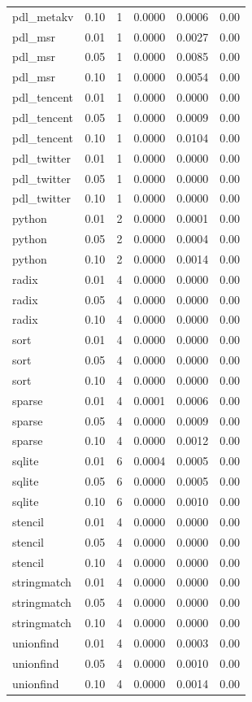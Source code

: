 \begin{tabular}{lcrrrr}
pdl\_metakv & 0.10 & 1 & 0.0000 & 0.0006 & 0.00 \\
pdl\_msr & 0.01 & 1 & 0.0000 & 0.0027 & 0.00 \\
pdl\_msr & 0.05 & 1 & 0.0000 & 0.0085 & 0.00 \\
pdl\_msr & 0.10 & 1 & 0.0000 & 0.0054 & 0.00 \\
pdl\_tencent & 0.01 & 1 & 0.0000 & 0.0000 & 0.00 \\
pdl\_tencent & 0.05 & 1 & 0.0000 & 0.0009 & 0.00 \\
pdl\_tencent & 0.10 & 1 & 0.0000 & 0.0104 & 0.00 \\
pdl\_twitter & 0.01 & 1 & 0.0000 & 0.0000 & 0.00 \\
pdl\_twitter & 0.05 & 1 & 0.0000 & 0.0000 & 0.00 \\
pdl\_twitter & 0.10 & 1 & 0.0000 & 0.0000 & 0.00 \\
python & 0.01 & 2 & 0.0000 & 0.0001 & 0.00 \\
python & 0.05 & 2 & 0.0000 & 0.0004 & 0.00 \\
python & 0.10 & 2 & 0.0000 & 0.0014 & 0.00 \\
radix & 0.01 & 4 & 0.0000 & 0.0000 & 0.00 \\
radix & 0.05 & 4 & 0.0000 & 0.0000 & 0.00 \\
radix & 0.10 & 4 & 0.0000 & 0.0000 & 0.00 \\
sort & 0.01 & 4 & 0.0000 & 0.0000 & 0.00 \\
sort & 0.05 & 4 & 0.0000 & 0.0000 & 0.00 \\
sort & 0.10 & 4 & 0.0000 & 0.0000 & 0.00 \\
sparse & 0.01 & 4 & 0.0001 & 0.0006 & 0.00 \\
sparse & 0.05 & 4 & 0.0000 & 0.0009 & 0.00 \\
sparse & 0.10 & 4 & 0.0000 & 0.0012 & 0.00 \\
sqlite & 0.01 & 6 & 0.0004 & 0.0005 & 0.00 \\
sqlite & 0.05 & 6 & 0.0000 & 0.0005 & 0.00 \\
sqlite & 0.10 & 6 & 0.0000 & 0.0010 & 0.00 \\
stencil & 0.01 & 4 & 0.0000 & 0.0000 & 0.00 \\
stencil & 0.05 & 4 & 0.0000 & 0.0000 & 0.00 \\
stencil & 0.10 & 4 & 0.0000 & 0.0000 & 0.00 \\
stringmatch & 0.01 & 4 & 0.0000 & 0.0000 & 0.00 \\
stringmatch & 0.05 & 4 & 0.0000 & 0.0000 & 0.00 \\
stringmatch & 0.10 & 4 & 0.0000 & 0.0000 & 0.00 \\
unionfind & 0.01 & 4 & 0.0000 & 0.0003 & 0.00 \\
unionfind & 0.05 & 4 & 0.0000 & 0.0010 & 0.00 \\
unionfind & 0.10 & 4 & 0.0000 & 0.0014 & 0.00 \\
\bottomrule
\end{tabular}
